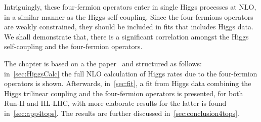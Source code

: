 \par Intriguingly, these  four-fermion operators enter in single Higgs processes at NLO, in a similar manner as the Higgs self-coupling. Since the four-fermions operators are weakly constrained, they should be included in fits that includes Higgs data. We shall demonstrate that, there is a significant correlation amongst the Higgs self-coupling and the four-fermion operators.
\par 
The chapter is based on a the paper~\cite{Alasfar:2022zyr} and structured as follows: in~\autoref{sec:HiggsCalc} the full NLO calculation of Higgs rates due to the four-fermion operators is shown. Afterwards, in~\autoref{sec:fit}, a fit from Higgs data combining the Higgs trilinear coupling and the four-fermion operators is presented, for both Run-II and HL-LHC, with more elaborate results for the latter is found in~\autoref{sec:app4tops}. The results are further discussed in~\autoref{sec:conclusion4tops}.
